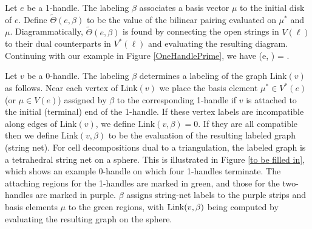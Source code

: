 Let $e$ be a 1-handle.
The labeling $\beta$ associates a basis vector $\mu$ to the initial disk of $e$.
Define $\widetilde\Theta(e, \beta)$ to be the value of the bilinear pairing evaluated on $\mu^*$ and $\mu$.
Diagrammatically, $\widetilde\Theta(e, \beta)$ is found by connecting the open strings in $V(\ell)$ to their dual counterparts in $V^*(\ell)$ and evaluating 
the resulting diagram.
Continuing with our example in Figure \ref{OneHandlePrime}, 
we have 
\be \widetilde \Theta (e, \beta) =  \Bananafourmu.
\ee


Let $v$ be a 0-handle.
The labeling $\beta$ determines a labeling of the graph $\text{Link}(v)$ as follows.
Near each vertex of $\text{Link}(v)$ we place the basis element $\mu^* \in V^*(e)$ (or $\mu \in V(e)$) assigned by $\beta$ to the 
corresponding 1-handle if $v$ is attached to the initial (terminal) end of the 1-handle.
If these vertex labels are incompatible along edges of $\text{Link}(v)$, we define $\text{Link}(v, \beta) = 0$.
If they are all compatible then we define $\text{Link}(v, \beta)$ to be the evaluation of the resulting labeled graph (string net).
For cell decompositions dual to a triangulation, 
the labeled graph is a tetrahedral string net on a sphere.
This is illustrated in Figure \ref{to be filled in}, which shows an example 0-handle on which 
four 1-handles terminate. The attaching regions for the 1-handles are marked in green, and those 
for the two-handles are marked in purple. $\beta$ assigns string-net labels to the purple strips and 
basis elements $\mu$ to the green regions, with ${\rm Link}(v,\beta)$ being computed by evaluating the resulting graph on the sphere. 

